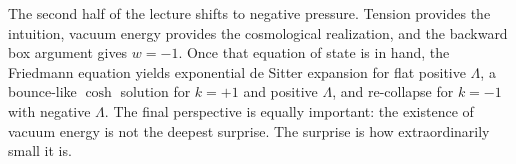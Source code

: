 The second half of the lecture shifts to negative pressure. Tension provides the intuition, vacuum energy provides the cosmological realization, and the backward box argument gives \(w=-1\). Once that equation of state is in hand, the Friedmann equation yields exponential de Sitter expansion for flat positive \(\Lambda\), a bounce-like \(\cosh\) solution for \(k=+1\) and positive \(\Lambda\), and re-collapse for \(k=-1\) with negative \(\Lambda\). The final perspective is equally important: the existence of vacuum energy is not the deepest surprise. The surprise is how extraordinarily small it is.